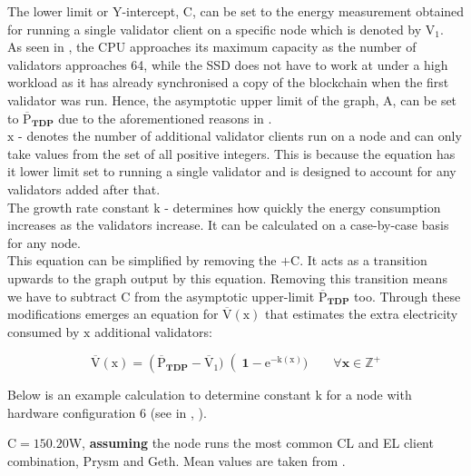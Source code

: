 The lower limit or Y-intercept, $\boldsymbol{\mathrm{C}}$, can be set to the energy measurement obtained for running a single validator client on a specific node which is denoted by $\boldsymbol{\mathrm{V_{1}}}$. \\
As seen in , the CPU approaches its maximum capacity as the number of validators approaches 64, while the SSD does not have to work at under a high workload as it has already synchronised a copy of the blockchain when the first validator was run. Hence, the asymptotic upper limit of the graph, $\boldsymbol{\mathrm{A}}$, can be set to $\boldsymbol{\mathrm{\overline{P}}_{TDP}}$ due to the aforementioned reasons in . \\
$\boldsymbol{\mathrm{x}}$ - denotes the number of additional validator clients run on a node and can only take values from the set of all positive integers. This is because the equation has it lower limit set to running a single validator and is designed to account for any validators added after that. \\
The growth rate constant $\boldsymbol{\mathrm{k}}$ - determines how quickly the energy consumption increases as the validators increase. It can be calculated on a case-by-case basis for any node. \\
This equation can be simplified by removing the $\boldsymbol{ + \mathrm{C}}$. It acts as a transition upwards to the graph output by this equation. Removing this transition means we have to subtract $\boldsymbol{ \mathrm{C}}$ from the asymptotic upper-limit $\boldsymbol{\mathrm{\overline{P}}_{TDP}}$ too. Through these modifications emerges an equation for $\boldsymbol{{\mathrm{\overline{V}(\mathrm{x})}}}$ that estimates the extra electricity consumed by $\boldsymbol{\mathrm{x}}$ additional validators:

\begin{equation}
    \label{eqn:ExpDecay}
    \boldsymbol{\mathrm{\overline{V}(\mathrm{x})} = \left(\mathrm{\overline{P}}_{TDP} -\mathrm{\overline{V}_{1}} )\right(1-\mathrm{e}^{-\mathrm{k}(\mathrm{x})}) \qquad \forall x \in \mathbb{Z}^+}
\end{equation}

\label{DetermineK}
Below is an example calculation to determine constant $\boldsymbol{\mathrm{k}}$ for a node with hardware configuration 6 (see in , ). 

$\boldsymbol{\mathrm{C}} = \boldsymbol{\mathrm{150.20}} $W, \textbf{assuming} the node runs the most common CL and EL client combination, Prysm and Geth. Mean values are taken from  \cite{CryptoCarbonRatingsInstitute2022TheNetwork}.

